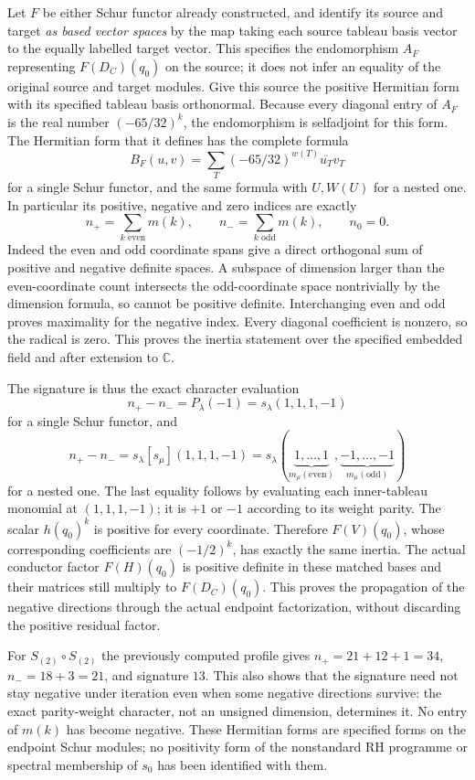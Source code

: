 Let $F$ be either Schur functor already constructed, and identify its
source and target \emph{as based vector spaces} by the map taking
each source tableau basis vector to the equally labelled target
vector. This specifies the endomorphism $A_F$ representing
$F(D_C)(q_0)$ on the source; it does not infer an equality of the
original source and target modules. Give this source the positive
Hermitian form with its specified tableau basis orthonormal.
Because every diagonal entry of $A_F$ is the real number
$(-65/32)^k$, the endomorphism is selfadjoint for this form.
The Hermitian form that it defines has the complete formula
\[
 B_F(u,v)=\sum_T(-65/32)^{w(T)}\overline{u_T}v_T
\]
for a single Schur functor, and the same formula with $U,W(U)$ for
a nested one. In particular its positive, negative and zero indices
are exactly
\begin{equation}\label{eq:plethysm-inertia}
 n_+=\sum_{k\text{ even}}m(k),\qquad
 n_-=\sum_{k\text{ odd}}m(k),\qquad n_0=0.
\end{equation}
Indeed the even and odd coordinate spans give a direct orthogonal
sum of positive and negative definite spaces. A subspace of dimension
larger than the even-coordinate count intersects the odd-coordinate
space nontrivially by the dimension formula, so cannot be positive
definite. Interchanging even and odd proves maximality for the
negative index. Every diagonal coefficient is nonzero, so the
radical is zero. This proves the inertia statement over the specified
embedded field and after extension to $\mathbb C$.

The signature is thus the exact character evaluation
\[
 n_+-n_-=P_\lambda(-1)=s_\lambda(1,1,1,-1)
\]
for a single Schur functor, and
\[
 n_+-n_-=s_\lambda[s_\mu](1,1,1,-1)
 =s_\lambda(\underbrace{1,\ldots,1}_{m_\mu(\mathrm{even})},
             \underbrace{-1,\ldots,-1}_{m_\mu(\mathrm{odd})})
\]
for a nested one. The last equality follows by evaluating each
inner-tableau monomial at $(1,1,1,-1)$; it is $+1$ or $-1$ according
to its weight parity. The scalar $h(q_0)^k$ is positive for every
coordinate. Therefore $F(V)(q_0)$, whose corresponding coefficients
are $(-1/2)^k$, has exactly the same inertia. The actual conductor
factor $F(H)(q_0)$ is positive definite in these matched bases and
their matrices still multiply to $F(D_C)(q_0)$. This proves the
propagation of the negative directions through the actual endpoint
factorization, without discarding the positive residual factor.

For $S_{(2)}\circ S_{(2)}$ the previously computed profile gives
$n_+=21+12+1=34$, $n_-=18+3=21$, and signature $13$.
This also shows that the signature need not stay negative under
iteration even when some negative directions survive: the exact
parity-weight character, not an unsigned dimension, determines it.
No entry of $m(k)$ has become negative. These Hermitian forms are
specified forms on the endpoint Schur modules; no positivity form
of the nonstandard RH programme or spectral membership of $s_0$
has been identified with them.

